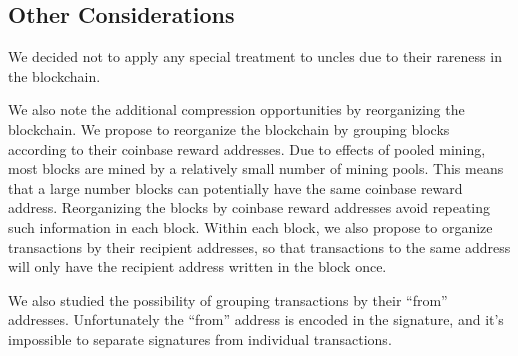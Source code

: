 \subsection{Other Considerations}

We decided not to apply any special treatment to uncles due to their rareness in the blockchain.

We also note the additional compression opportunities by reorganizing the blockchain.
We propose to reorganize the blockchain by grouping blocks according to their coinbase reward addresses.
Due to effects of pooled mining, most blocks are mined by a relatively small number of mining pools.
This means that a large number blocks can potentially have the same coinbase reward address.
Reorganizing the blocks by coinbase reward addresses avoid repeating such information in each block.
Within each block, we also propose to organize transactions by their recipient addresses, so that
transactions to the same address will only have the recipient address written in the block once.

We also studied the possibility of grouping transactions by their ``from'' addresses.
Unfortunately the ``from'' address is encoded in the signature, and it's impossible to
separate signatures from individual transactions.
